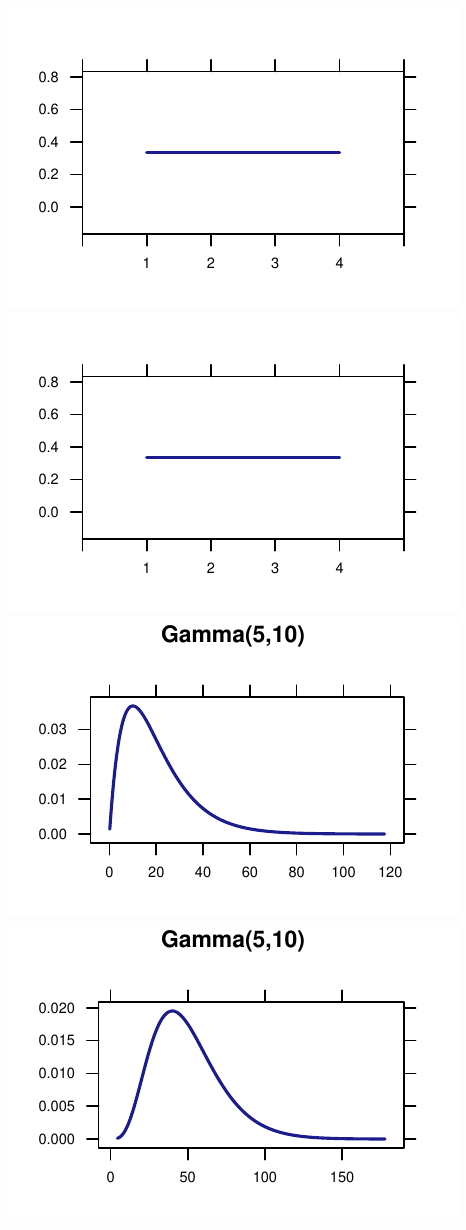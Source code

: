 \documentclass[twoside]{book}\usepackage[]{graphicx}\usepackage[]{xcolor}
\makeatletter
\def\maxwidth{ %
  \ifdim\Gin@nat@width>\linewidth
    \linewidth
  \else
    \Gin@nat@width
  \fi
}
\newenvironment{knitrout}{}{} %
\makeatother
\begin{document}
\begin{knitrout}
{\centering \includegraphics[width=\maxwidth]{figures/fig-unnamed-chunk-78-1} 
\includegraphics[width=\maxwidth]{figures/fig-unnamed-chunk-78-2} 
\includegraphics[width=\maxwidth]{figures/fig-unnamed-chunk-78-3} 
\includegraphics[width=\maxwidth]{figures/fig-unnamed-chunk-78-4} 

}
\end{knitrout}
\end{document}
